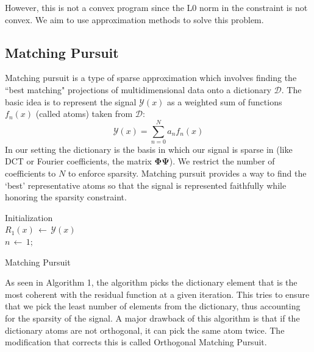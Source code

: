 \documentclass[letterpaper, 10 pt, conference]{article}
\begin{document}
However, this is not a convex program since the L0 norm in the constraint is not convex. We aim to use approximation methods to solve this problem.

\subsection{Matching Pursuit}
Matching pursuit \cite{wiki_mp} is a type of sparse approximation which involves finding the ``best matching" projections of multidimensional data onto a dictionary $\mathcal{D}$. The basic idea is to represent the signal $\mathcal{Y}(x)$ as a weighted sum of functions $f_{n}(x)$ (called atoms) taken from $\mathcal{D}$:
$$\mathcal{Y}(x) = \sum_{n=0}^{N} a_n f_{n}(x)$$
In our setting the dictionary is the basis in which our signal is sparse in (like DCT or Fourier coefficients, the matrix $\mathbf{\Phi \Psi}$). We restrict the number of coefficients to $N$ to enforce sparsity. Matching pursuit provides a way to find the `best' representative atoms so that the signal is represented faithfully while honoring the sparsity constraint.

\begin{algorithm}[]
 Initialization\: \\
 $R_1(x)\,\leftarrow\,\mathcal{Y}(x)$ \\
 $n\,\leftarrow\,1;$\\
 \caption{Matching Pursuit}
\end{algorithm}

As seen in Algorithm 1, the algorithm picks the dictionary element that is the most coherent with the residual function at a given iteration. This tries to ensure that we pick the least number of elements from the dictionary, thus accounting for the sparsity of the signal. A major drawback of this algorithm is that if the dictionary atoms are not orthogonal, it can pick the same atom twice. The modification that corrects this is called Orthogonal Matching Pursuit.
\end{document}
